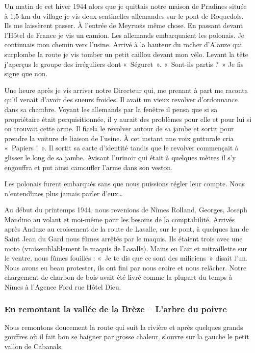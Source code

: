 Un matin de cet hiver 1944 alors que je quittais notre maison de Pradines située à 1,5 km du
village je vis deux sentinelles allemandes sur le pont de Roquedols. Ils me laissèrent passer. À
l’entrée de Meyrueis même chose. En passant devant l’Hôtel de France je vis un camion. Les
allemands embarquaient les polonais. Je continuais mon chemin vers l’usine. Arrivé à la
hauteur du rocher d’Alauze qui surplombe la route je vis tomber un petit caillou devant mon
vélo. Levant la tête j’aperçus le groupe des irréguliers dont «~Séguret~». «~Sont-ils partis ?~»
Je fis signe que non.

Une heure après je vis arriver notre Directeur qui, me prenant à part me raconta qu’il venait
d’avoir des sueurs froides. Il avait un vieux revolver d’ordonnance dans sa chambre. Voyant
les allemands par la fenêtre il pensa que si sa propriétaire était perquisitionnée, il y aurait des
problèmes pour elle et pour lui si on trouvait cette arme. Il ficela le revolver autour de sa
jambe et sortit pour prendre la voiture de liaison de l’usine. À cet instant une voix gutturale
cria «~Papiers !~». Il sortit sa carte d’identité tandis que le revolver commençait à glisser le
long de sa jambe. Avisant l’urinoir qui était à quelques mètres il s’y engouffra et put ainsi
camoufler l’arme dans son veston.

Les polonais furent embarqués sans que nous puissions régler leur compte. Nous
n’entendîmes plus jamais parler d’eux…


Au début du printemps 1944, nous revenions de Nîmes Rolland, Georges, Joseph Mondino au
volant et moi-même pour les besoins de la comptabilité. Arrivés après Anduze au croisement
de la route de Lasalle, sur le pont, à quelques km de Saint Jean du Gard nous fûmes arrêtés
par le maquis. Ils étaient trois avec une moto (vraisemblablement le maquis de Lasalle).
Mains en l’air et mitraillette sur le ventre, nous fûmes fouillés : «~Je te dis que ce sont des
miliciens~» disait l’un. Nous avons eu beau protester, ils ont fini par nous croire et nous
relâcher. Notre chargement de charbon de bois avait été livré comme la plupart du temps à
Nîmes à l’Agence Ford rue Hôtel Dieu.

\subsubsection{En remontant la vallée de la Brèze -- L'arbre du poivre}

Nous remontons doucement la route qui suit la rivière et après quelques grands gouffres où il
fait bon se baigner par grosse chaleur, s’ouvre sur la gauche le petit vallon de Cabanals.

